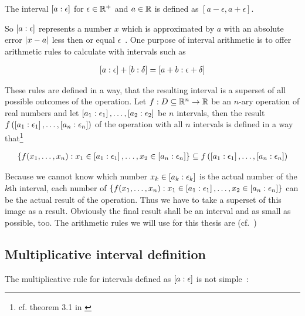 \begin{definition}
  The interval $\an{a}$ for $\epsilon \in \Rplus$ and $a\in \R$ is defined as $[a-\epsilon,a+\epsilon]$.
\end{definition}

So $\an{a}$ represents a number $x$ which is approximated by $a$ with an absolute error $\abs{x-a}$ less then or equal $\epsilon$~\cite[p.~5]{moore:methods}. One purpose of interval arithmetic is to offer arithmetic rules to calculate with intervals such as~\cite[pp.~19-20]{kulla}

\begin{align}
  \an{a}+\an[\delta]{b} = \an[\epsilon+\delta]{a+b}
\end{align}

These rules are defined in a way, that the resulting interval is a superset of all possible outcomes of the operation. Let $f:D\subseteq\R^n\to\R$ be an $n$-ary operation of real numbers and let $\an[\epsilon_1]{a_1},\ldots,\an[\epsilon_2]{a_2}$ be $n$ intervals, then the result  $f\left(\an[\epsilon_1]{a_1},\ldots,\an[\epsilon_n]{a_n}\right)$ of the operation with all $n$ intervals is defined in a way that\footnote{cf. theorem 3.1 in \cite[p. 21]{moore:methods}} 

\begin{align}
  \left\{f(x_1,\ldots,x_n):x_1\in\an[\epsilon_1]{a_1},\ldots,x_2\in\an[\epsilon_n]{a_n}\right\} \subseteq f\left(\an[\epsilon_1]{a_1},\ldots,\an[\epsilon_n]{a_n}\right)
\end{align}

Because we cannot know which number $x_k \in \an[\epsilon_k]{a_k}$ is the actual number of the $k$th interval, each number of $\left\{f(x_1,\ldots,x_n):x_1\in\an[\epsilon_1]{a_1},\ldots,x_2\in\an[\epsilon_n]{a_n}\right\}$ can be the actual result of the operation. Thus we have to take a superset of this image as a result. Obviously the final result shall be an interval and as small as possible, too. The arithmetic rules we will use for this thesis are (cf.~\cite[pp.~19-24.]{kulla})



\subsection{Multiplicative interval definition}

The multiplicative rule for intervals defined as $\an{a}$ is not simple~\cite[p.~22]{kulla}:

